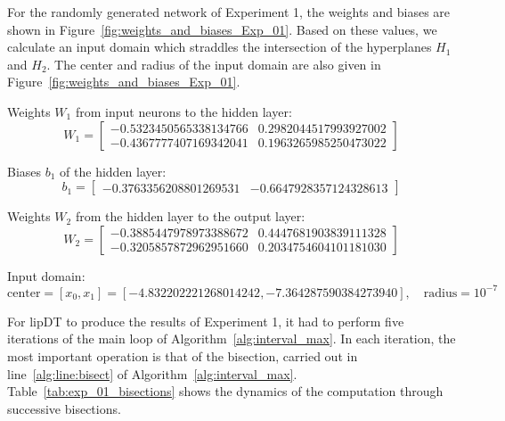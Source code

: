 \documentclass[11pt,times]{article}
\begin{document}
For the randomly generated network of Experiment 1, the weights and
biases are shown in Figure~\ref{fig:weights_and_biases_Exp_01}. Based
on these values, we calculate an input domain which straddles the
intersection of the hyperplanes $H_1$ and $H_2$. The center and radius
of the input domain are also given in
Figure~\ref{fig:weights_and_biases_Exp_01}.
%
\begin{figure*}[t]
  \centering
  Weights $W_1$ from input neurons to the hidden layer:
\begin{equation*}
  W_1 =
  \begin{bmatrix}
    -0.5323450565338134766 & 0.2982044517993927002\\
    -0.4367777407169342041 & 0.1963265985250473022
  \end{bmatrix}  
\end{equation*}

Biases $b_1$ of the hidden layer:
\begin{equation*}
  b_1 =
  \begin{bmatrix}
  -0.3763356208801269531&  -0.6647928357124328613  
  \end{bmatrix}
\end{equation*}


Weights $W_2$ from the hidden layer to the output layer:
\begin{equation*}
  W_2 =
  \begin{bmatrix}
    -0.3885447978973388672 & 0.4447681903839111328\\
   -0.3205857872962951660 & 0.2034754604101181030
  \end{bmatrix}  
\end{equation*}


Input domain:
\begin{equation*}
\text{center} = [x_0,x_1] = [-4.832202221268014242,
-7.364287590384273940], \quad \text{radius} = 10^{-7}
\end{equation*}

\caption{Weights, biases, and the input domain of the network of
  Experiment 1.}
  \label{fig:weights_and_biases_Exp_01}
\end{figure*}







For lipDT to produce the results of Experiment 1, it had to perform
five iterations of the main loop of
Algorithm~\ref{alg:interval_max}. In each iteration, the most
important operation is that of the bisection, carried out in
line~\ref{alg:line:bisect} of
Algorithm~\ref{alg:interval_max}. Table~\ref{tab:exp_01_bisections}
shows the dynamics of the computation through successive bisections.
\end{document}
